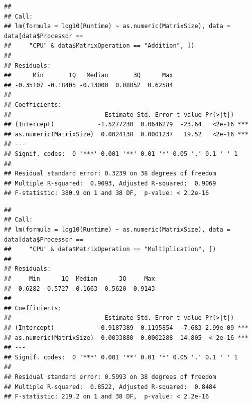 \documentclass[
]{article}
\newenvironment{Shaded}{\begin{snugshade}}{\end{snugshade}}
\newcommand{\KeywordTok}[1]{\textcolor[rgb]{0.13,0.29,0.53}{\textbf{#1}}}
\newcommand{\NormalTok}[1]{#1}
\newcommand{\OperatorTok}[1]{\textcolor[rgb]{0.81,0.36,0.00}{\textbf{#1}}}
\newcommand{\StringTok}[1]{\textcolor[rgb]{0.31,0.60,0.02}{#1}}
\begin{document}
\begin{verbatim}
## 
## Call:
## lm(formula = log10(Runtime) ~ as.numeric(MatrixSize), data = data[data$Processor == 
##     "CPU" & data$MatrixOperation == "Addition", ])
## 
## Residuals:
##      Min       1Q   Median       3Q      Max 
## -0.35107 -0.18405 -0.13000  0.08052  0.62584 
## 
## Coefficients:
##                          Estimate Std. Error t value Pr(>|t|)    
## (Intercept)            -1.5277230  0.0646279  -23.64   <2e-16 ***
## as.numeric(MatrixSize)  0.0024138  0.0001237   19.52   <2e-16 ***
## ---
## Signif. codes:  0 '***' 0.001 '**' 0.01 '*' 0.05 '.' 0.1 ' ' 1
## 
## Residual standard error: 0.3239 on 38 degrees of freedom
## Multiple R-squared:  0.9093, Adjusted R-squared:  0.9069 
## F-statistic: 380.9 on 1 and 38 DF,  p-value: < 2.2e-16
\end{verbatim}

\begin{Shaded}
\end{Shaded}

\begin{verbatim}
## 
## Call:
## lm(formula = log10(Runtime) ~ as.numeric(MatrixSize), data = data[data$Processor == 
##     "CPU" & data$MatrixOperation == "Multiplication", ])
## 
## Residuals:
##     Min      1Q  Median      3Q     Max 
## -0.6282 -0.5727 -0.1663  0.5620  0.9143 
## 
## Coefficients:
##                          Estimate Std. Error t value Pr(>|t|)    
## (Intercept)            -0.9187389  0.1195854  -7.683 2.99e-09 ***
## as.numeric(MatrixSize)  0.0033880  0.0002288  14.805  < 2e-16 ***
## ---
## Signif. codes:  0 '***' 0.001 '**' 0.01 '*' 0.05 '.' 0.1 ' ' 1
## 
## Residual standard error: 0.5993 on 38 degrees of freedom
## Multiple R-squared:  0.8522, Adjusted R-squared:  0.8484 
## F-statistic: 219.2 on 1 and 38 DF,  p-value: < 2.2e-16
\end{verbatim}

\begin{Shaded}
\end{Shaded}
\end{document}

